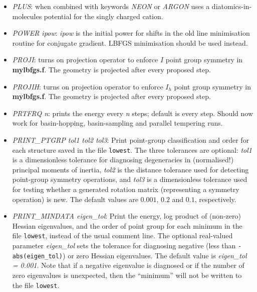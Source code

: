 \documentclass[12pt,a4paper,dvips]{article}
\begin{document}
\begin{itemize}
\item {\it PLUS\/}: when combined with keywords {\it NEON\/} or {\it ARGON\/}
uses a diatomics-in-molecules potential for the singly charged cation.



\item {\it POWER ipow\/}: {\it ipow\/} is the initial power for shifts in the old line minimisation routine
for conjugate gradient. LBFGS minimisation should be used instead.

\item {\it PROJI\/}: turns on projection operator to enforce $I$ point group symmetry
in {\bf mylbfgs.f}. The geometry is projected after every proposed step.

\item {\it PROJIH\/}: turns on projection operator to enforce $I_h$ point group symmetry
in {\bf mylbfgs.f}. The geometry is projected after every proposed step.

\item {\it PRTFRQ n\/}: prints the energy every {\it n\/} steps; default is every step.
Should now work for basin-hopping, basin-sampling and parallel tempering runs.

\item {\it PRINT\_PTGRP tol1 tol2 tol3\/}: Print point-group classification and order for each structure saved in the file {\tt lowest\/}. The three tolerances are optional: {\it tol1\/} is a dimensionless tolerance for diagnosing degeneracies in (normalised!) principal moments of inertia, {\it tol2\/} is the distance tolerance used for detecting point-group symmetry operations, and {\it tol3\/} is a dimensionless tolerance used for testing whether a generated rotation matrix (representing a symmetry operation) is new. The default values are $0.001$, $0.2$ and $0.1$, respectively.

\item {\it PRINT\_MINDATA eigen\_tol\/}: Print the energy, log product of (non-zero) Hessian eigenvalues, and the order of point group for each minimum in the file {\tt lowest\/}, instead of the usual comment line. The optional real-valued parameter {\it eigen\_tol\/} sets the tolerance for diagnosing negative (less than {\tt-abs(eigen\_tol)}) or zero Hessian eigenvalues. The default value is {\it eigen\_tol = 0.001\/}. Note that if a negative eigenvalue is diagnosed or if the number of zero eigenvalues is unexpected, then the ``minimum'' will not be written to the file {\tt lowest\/}. 


\end{itemize}
\end{document}
